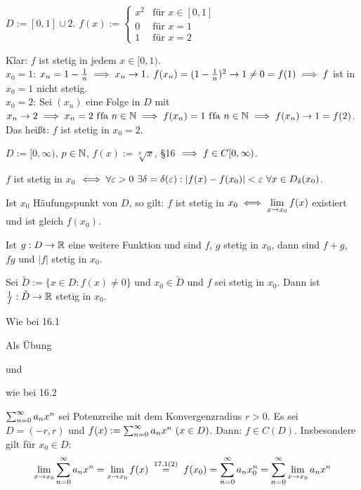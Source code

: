 \documentclass[a4paper,twoside,DIV15,BCOR12mm]{scrbook}
\begin{document}
\begin{beispiele}
\item $D:= [0,1]\cup{2}$. $f(x) := \begin{cases} x^2 & \text{für } x\in[0,1] \\ 0 & \text{für } x = 1 \\ 1 & \text{für } x=2 \end{cases}$

Klar: $f$ ist stetig in jedem $x\in[0,1)$.\\
$x_0 = 1$: $x_n = 1- \frac{1}{n} \implies x_n \to 1$. $f(x_n) = (1-\frac{1}{n})^2\to1 \ne0 = f(1) \implies f$ ist in $x_0 = 1$ nicht stetig. \\
$x_0 = 2$: Sei $(x_n)$ eine Folge in $D$ mit $x_n \to 2 \implies x_n = 2 \text{ f\/fa } n\in\mathbb{N} \implies f(x_n) = 1 \text{ f\/fa } n\in\mathbb{N} \implies f(x_n) \to 1 = f(2)$. Das heißt: $f$ ist stetig in $x_0 = 2$.
\item $D:= [0,\infty)$, $p\in\mathbb{N}$, $f(x) := \sqrt[p]{x}$, §16 $\implies f \in C[0,\infty)$.
\end{beispiele}

\begin{satz}[Stetigkeitssätze]
\begin{liste}
\item $f$ ist stetig in $x_0$ $\iff \forall \varepsilon > 0\  \exists \delta = \delta(\varepsilon): |f(x)-f(x_0)|<\varepsilon \ \forall x\in D_\delta(x_0)$.
\item Ist $x_0$ Häufungspunkt von $D$, so gilt: $f$ ist stetig in $x_0 \iff \displaystyle\lim_{x\to x_0}f(x)$ existiert und ist gleich $f(x_0)$.
\item Ist $g: D\to \mathbb{R}$ eine weitere Funktion und sind $f$, $g$ stetig in $x_0$, dann sind $f+g$, $fg$ und $|f|$ stetig in $x_0$.
\item Sei $\tilde D := \{x\in D: f(x)\ne0\}$ und $x_0 \in \tilde D$ und $f$ sei stetig in $x_0$. Dann ist $\frac{1}{f}: \tilde D\to\mathbb{R}$ stetig in $x_0$.
\end{liste}
\end{satz}

\begin{beweise}
\item Wie bei 16.1
\item Als Übung
\item und
\item wie bei 16.2
\end{beweise}

\begin{satz}
$\sum_{n=0}^{\infty}{a_n x^n}$ sei Potenzreihe mit dem Konvergenzradius $r>0$. Es sei $D=(-r,r)$ und $f(x) := \sum_{n=0}^{\infty}{a_nx^n}\ (x\in D)$. Dann: $f \in C(D)$. Insbesondere gilt für $x_0 \in D:$
$$\lim_{x\to x_0} \reihenull{a_nx^n} = \lim_{x\to x_0} f(x) \gleichnach{17.1(2)} f(x_0) = \reihenull{a_nx_0^n} = \reihenull{\lim_{x\to x_0}a_nx^n}$$
\end{satz}
\end{document}
